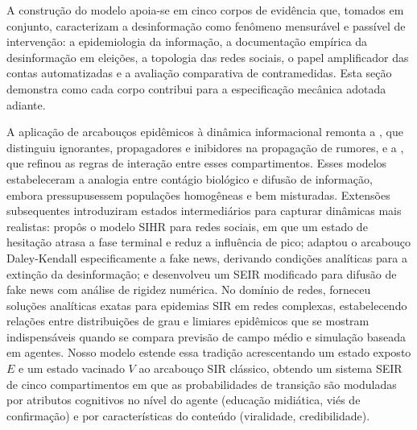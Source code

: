 \documentclass[12pt,a4paper]{article}
\theoremstyle{definition}
\theoremstyle{plain}
\begin{document}
A construção do modelo apoia-se em cinco corpos de evidência que, tomados em conjunto, caracterizam a desinformação como fenômeno mensurável e passível de intervenção: a epidemiologia da informação, a documentação empírica da desinformação em eleições, a topologia das redes sociais, o papel amplificador das contas automatizadas e a avaliação comparativa de contramedidas. Esta seção demonstra como cada corpo contribui para a especificação mecânica adotada adiante.

A aplicação de arcabouços epidêmicos à dinâmica informacional remonta a \citet{daley1964epidemics}, que distinguiu ignorantes, propagadores e inibidores na propagação de rumores, e a \citet{maki1973mathematical}, que refinou as regras de interação entre esses compartimentos. Esses modelos estabeleceram a analogia entre contágio biológico e difusão de informação, embora pressupusessem populações homogêneas e bem misturadas. Extensões subsequentes introduziram estados intermediários para capturar dinâmicas mais realistas: \citet{zhao2013sihr} propôs o modelo SIHR para redes sociais, em que um estado de hesitação atrasa a fase terminal e reduz a influência de pico; \citet{piqueira2020daley} adaptou o arcabouço Daley-Kendall especificamente a fake news, derivando condições analíticas para a extinção da desinformação; e \citet{ferrara2022modified} desenvolveu um SEIR modificado para difusão de fake news com análise de rigidez numérica. No domínio de redes, \citet{newman2002spread} forneceu soluções analíticas exatas para epidemias SIR em redes complexas, estabelecendo relações entre distribuições de grau e limiares epidêmicos que se mostram indispensáveis quando se compara previsão de campo médio e simulação baseada em agentes. Nosso modelo estende essa tradição acrescentando um estado exposto $E$ e um estado vacinado $V$ ao arcabouço SIR clássico, obtendo um sistema SEIR de cinco compartimentos em que as probabilidades de transição são moduladas por atributos cognitivos no nível do agente (educação midiática, viés de confirmação) e por características do conteúdo (viralidade, credibilidade).
\end{document}
